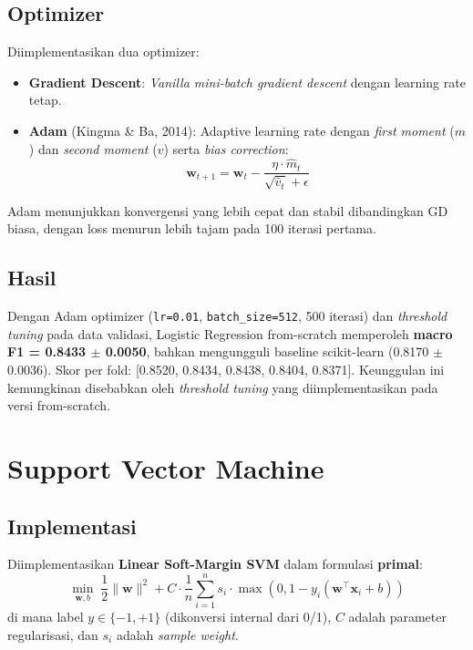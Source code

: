 \documentclass[12pt,a4paper]{article}
\begin{document}
\subsection{Optimizer}

Diimplementasikan dua optimizer:
\begin{itemize}
    \item \textbf{Gradient Descent}: \textit{Vanilla mini-batch gradient descent} dengan learning rate tetap.
    \item \textbf{Adam} (Kingma \& Ba, 2014): Adaptive learning rate dengan \textit{first moment} ($m$) dan \textit{second moment} ($v$) serta \textit{bias correction}:
    \[
        \mathbf{w}_{t+1} = \mathbf{w}_t - \frac{\eta \cdot \hat{m}_t}{\sqrt{\hat{v}_t} + \epsilon}
    \]
\end{itemize}

Adam menunjukkan konvergensi yang lebih cepat dan stabil dibandingkan GD biasa, dengan loss menurun lebih tajam pada 100 iterasi pertama.

\subsection{Hasil}

Dengan Adam optimizer (\texttt{lr=0.01}, \texttt{batch\_size=512}, 500 iterasi) dan \textit{threshold tuning} pada data validasi, Logistic Regression from-scratch memperoleh \textbf{macro F1 = 0.8433 $\pm$ 0.0050}, bahkan mengungguli baseline scikit-learn (0.8170 $\pm$ 0.0036). Skor per fold: [0.8520, 0.8434, 0.8438, 0.8404, 0.8371]. Keunggulan ini kemungkinan disebabkan oleh \textit{threshold tuning} yang diimplementasikan pada versi from-scratch.

\section{Support Vector Machine}
\label{sec:svm}

\subsection{Implementasi}

Diimplementasikan \textbf{Linear Soft-Margin SVM} dalam formulasi \textbf{primal}:
\[
    \min_{\mathbf{w}, b} \; \frac{1}{2}\|\mathbf{w}\|^2 + C \cdot \frac{1}{n} \sum_{i=1}^{n} s_i \cdot \max(0, 1 - y_i(\mathbf{w}^\top \mathbf{x}_i + b))
\]
di mana label $y \in \{-1, +1\}$ (dikonversi internal dari 0/1), $C$ adalah parameter regularisasi, dan $s_i$ adalah \textit{sample weight}.
\end{document}
